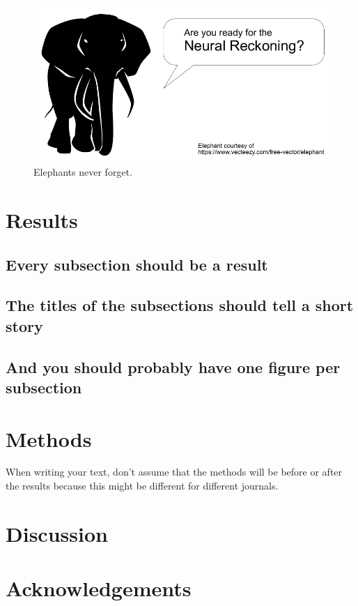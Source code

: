 \documentclass{article}
\begin{document}
\begin{figure}[!htbp]
    \centering
    \includegraphics[width=0.5\linewidth]{figures/elephant.pdf}
    \caption{Elephants never forget.}
    \label{fig:elephant}
\end{figure}

\section{Results}\label{sec:results}

\subsection{Every subsection should be a result}

\subsection{The titles of the subsections should tell a short story}

\subsection{And you should probably have one figure per subsection}

\section{Methods}\label{sec:methods}

When writing your text, don't assume that the methods will be before or after the results because this might be different for different journals.

\section{Discussion}\label{sec:discussion}

\section*{Acknowledgements}\label{sec:acknowledgements}



\end{document}
